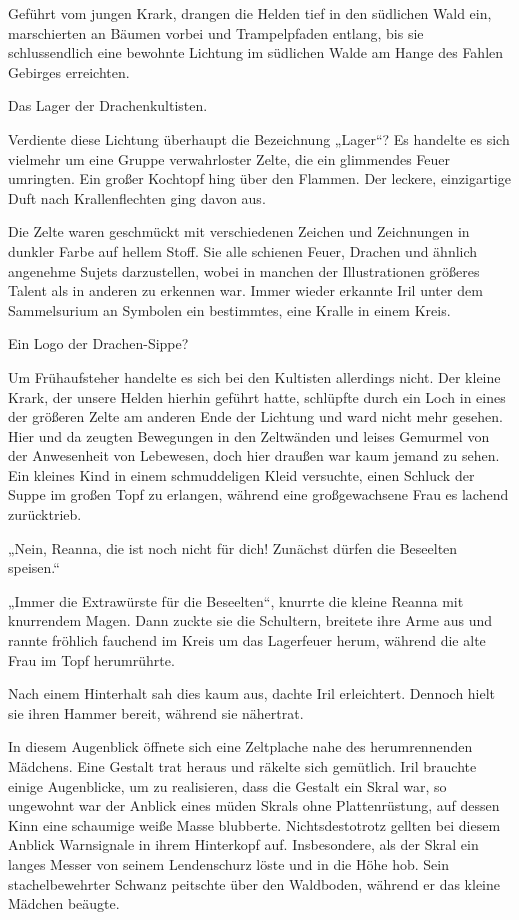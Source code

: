 Geführt vom jungen Krark, drangen die Helden tief in den südlichen Wald ein, marschierten an Bäumen vorbei und Trampelpfaden entlang, bis sie schlussendlich eine bewohnte Lichtung im südlichen Walde am Hange des Fahlen Gebirges erreichten.

Das Lager der Drachenkultisten.\bigskip







Verdiente diese Lichtung überhaupt die Bezeichnung „Lager“? Es handelte es sich vielmehr um eine Gruppe verwahrloster Zelte, die ein glimmendes Feuer umringten. Ein großer Kochtopf hing über den Flammen. Der leckere, einzigartige Duft nach Krallenflechten ging davon aus.

Die Zelte waren geschmückt mit verschiedenen Zeichen und Zeichnungen in dunkler Farbe auf hellem Stoff. Sie alle schienen Feuer, Drachen und ähnlich angenehme Sujets darzustellen, wobei in manchen der Illustrationen größeres Talent als in anderen zu erkennen war. Immer wieder erkannte Iril unter dem Sammelsurium an Symbolen ein bestimmtes, eine Kralle in einem Kreis.

Ein Logo der Drachen-Sippe?

Um Frühaufsteher handelte es sich bei den Kultisten allerdings nicht. Der kleine Krark, der unsere Helden hierhin geführt hatte, schlüpfte durch ein Loch in eines der größeren Zelte am anderen Ende der Lichtung und ward nicht mehr gesehen. Hier und da zeugten Bewegungen in den Zeltwänden und leises Gemurmel von der Anwesenheit von Lebewesen, doch hier draußen war kaum jemand zu sehen. Ein kleines Kind in einem schmuddeligen Kleid versuchte, einen Schluck der Suppe im großen Topf zu erlangen, während eine großgewachsene Frau es lachend zurücktrieb.

„Nein, Reanna, die ist noch nicht für dich! Zunächst dürfen die Beseelten speisen.“

„Immer die Extrawürste für die Beseelten“, knurrte die kleine Reanna mit knurrendem Magen. Dann zuckte sie die Schultern, breitete ihre Arme aus und rannte fröhlich fauchend im Kreis um das Lagerfeuer herum, während die alte Frau im Topf herumrührte.

Nach einem Hinterhalt sah dies kaum aus, dachte Iril erleichtert. Dennoch hielt sie ihren Hammer bereit, während sie nähertrat.

In diesem Augenblick öffnete sich eine Zeltplache nahe des herumrennenden Mädchens. Eine Gestalt trat heraus und räkelte sich gemütlich. Iril brauchte einige Augenblicke, um zu realisieren, dass die Gestalt ein Skral war, so ungewohnt war der Anblick eines müden Skrals ohne Plattenrüstung, auf dessen Kinn eine schaumige weiße Masse blubberte. Nichtsdestotrotz gellten bei diesem Anblick Warnsignale in ihrem Hinterkopf auf. Insbesondere, als der Skral ein langes Messer von seinem Lendenschurz löste und in die Höhe hob. Sein stachelbewehrter Schwanz peitschte über den Waldboden, während er das kleine Mädchen beäugte.

